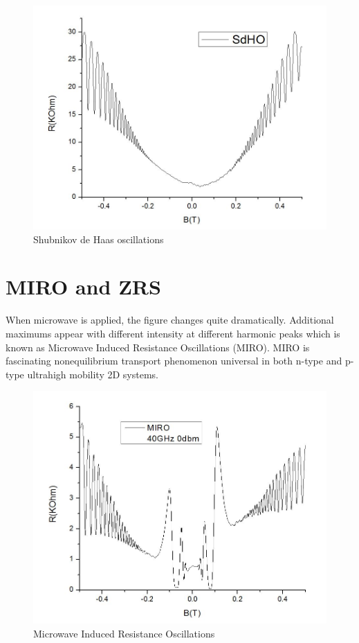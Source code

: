 \documentclass[12pt]{ruthesis}
\begin{document}
\begin{figure}[h]
  \centering
  \includegraphics[scale=0.25]{figures/sdho.JPG}
  \caption{Shubnikov de Haas oscillations}
  \label{sdho}
\end{figure}






\section{MIRO and ZRS}\label{MIRO&ZRS}

When microwave is applied, the figure changes quite dramatically.
Additional maximums appear with different intensity at different harmonic peaks which is known as Microwave Induced Resistance Oscillations (MIRO).
MIRO is fascinating nonequilibrium transport phenomenon universal in both n-type and p-type ultrahigh mobility 2D systems. 

\begin{figure}
  \centering
  \includegraphics[totalheight=8cm]{figures/miro.JPG}
  \caption{Microwave Induced Resistance Oscillations}
  \label{miro}
\end{figure}
 
\end{document}
